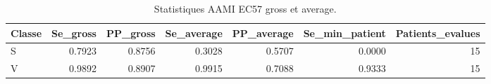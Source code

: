 \begin{table}
\caption{Statistiques AAMI EC57 gross et average.}
\label{tab:ec57}
\begin{tabular}{lrrrrrr}
\toprule
Classe & Se_gross & PP_gross & Se_average & PP_average & Se_min_patient & Patients_evalues \\
\midrule
S & 0.7923 & 0.8756 & 0.3028 & 0.5707 & 0.0000 & 15 \\
V & 0.9892 & 0.8907 & 0.9915 & 0.7088 & 0.9333 & 15 \\
\bottomrule
\end{tabular}
\end{table}
